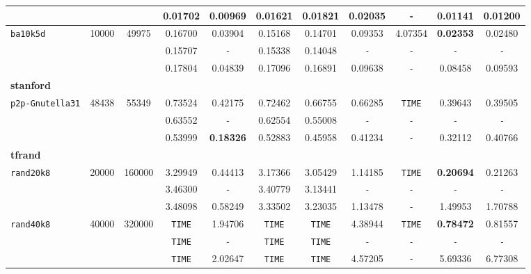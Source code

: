 {\begin{tabular}{ l c c | c c c c c c c c }
 &  &  & 0.01702 & 0.00969 & 0.01621 & 0.01821 & 0.02035 & \verb|-| & 0.01141 & 0.01200 \\
\hline
\verb|ba10k5d| & 10000 & 49975 & 0.16700 & 0.03904 & 0.15168 & 0.14701 & 0.09353 & 4.07354 & \textbf{0.02353} & 0.02480 \\
 &  &  & 0.15707 & \verb|-| & 0.15338 & 0.14048 & \verb|-| & \verb|-| & \verb|-| & \verb|-| \\
 &  &  & 0.17804 & 0.04839 & 0.17096 & 0.16891 & 0.09638 & \verb|-| & 0.08458 & 0.09593 \\
\hline
\multicolumn{11}{l}{\textbf{stanford}} \\
\hline
\verb|p2p-Gnutella31| & 48438 & 55349 & 0.73524 & 0.42175 & 0.72462 & 0.66755 & 0.66285 & \verb|TIME| & 0.39643 & 0.39505 \\
 &  &  & 0.63552 & \verb|-| & 0.62554 & 0.55008 & \verb|-| & \verb|-| & \verb|-| & \verb|-| \\
 &  &  & 0.53999 & \textbf{0.18326} & 0.52883 & 0.45958 & 0.41234 & \verb|-| & 0.32112 & 0.40766 \\
\hline
\multicolumn{11}{l}{\textbf{tfrand}} \\
\hline
\verb|rand20k8| & 20000 & 160000 & 3.29949 & 0.44413 & 3.17366 & 3.05429 & 1.14185 & \verb|TIME| & \textbf{0.20694} & 0.21263 \\
 &  &  & 3.46300 & \verb|-| & 3.40779 & 3.13441 & \verb|-| & \verb|-| & \verb|-| & \verb|-| \\
 &  &  & 3.48098 & 0.58249 & 3.33502 & 3.23035 & 1.13478 & \verb|-| & 1.49953 & 1.70788 \\
\hline
\verb|rand40k8| & 40000 & 320000 & \verb|TIME| & 1.94706 & \verb|TIME| & \verb|TIME| & 4.38944 & \verb|TIME| & \textbf{0.78472} & 0.81557 \\
 &  &  & \verb|TIME| & \verb|-| & \verb|TIME| & \verb|TIME| & \verb|-| & \verb|-| & \verb|-| & \verb|-| \\
 &  &  & \verb|TIME| & 2.02647 & \verb|TIME| & \verb|TIME| & 4.57205 & \verb|-| & 5.69336 & 6.77308 \\
\hline
  \end{tabular}
}

